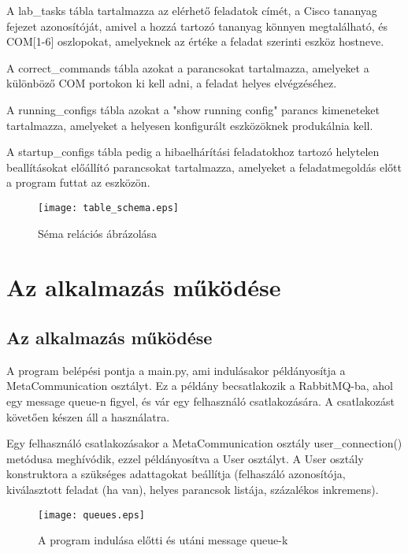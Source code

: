 \documentclass[12pt]{report}
\begin{document}
\onehalfspacing

A lab\_tasks tábla tartalmazza az elérhető feladatok címét, a Cisco tananyag fejezet azonosítóját, amivel a hozzá tartozó tananyag könnyen megtalálható, és COM[1-6] oszlopokat, amelyeknek az értéke a feladat szerinti eszköz hostneve.

A correct\_commands tábla azokat a parancsokat tartalmazza, amelyeket a különböző COM portokon ki kell adni, a feladat helyes elvégzéséhez.

A running\_configs tábla azokat a "show running config" parancs kimeneteket tartalmazza, amelyeket a helyesen konfigurált eszközöknek produkálnia kell.


A startup\_configs tábla pedig a hibaelhárítási feladatokhoz tartozó helytelen beallításokat előállító parancsokat tartalmazza, amelyeket a feladatmegoldás előtt a program futtat az eszközön.

\begin{figure}[h]
    \centering
    \texttt{[image: table\_schema.eps]}
    \caption{Séma relációs ábrázolása}
\end{figure}

\chapter{Az alkalmazás működése}
\section{Az alkalmazás működése}


A program belépési pontja a main.py, ami indulásakor példányosítja a MetaCommunication osztályt.
Ez a példány becsatlakozik a RabbitMQ-ba, ahol egy message queue-n figyel, és vár egy felhasználó csatlakozására. A csatlakozást követően készen áll a használatra.

Egy felhasználó csatlakozásakor a MetaCommunication osztály user\_connection() metódusa meghívódik, ezzel példányosítva a User osztályt. A User osztály konstruktora a szükséges adattagokat beállítja (felhaszáló azonosítója, kiválasztott feladat (ha van), helyes parancsok listája, százalékos inkremens).


\begin{figure}[h]
    \centering
    \texttt{[image: queues.eps]}
    \caption{A program indulása előtti és utáni message queue-k}
\end{figure}
\end{document}
